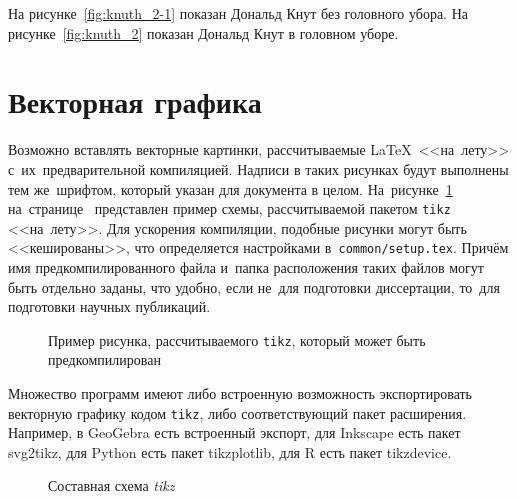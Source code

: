 На рисунке~\cref{fig:knuth_2-1} показан Дональд Кнут без головного убора.
На рисунке~\cref{fig:knuth_2}
показан Дональд Кнут в головном уборе.

\section{Векторная графика}\label{sec:ch2/vector}

Возможно вставлять векторные картинки, рассчитываемые \LaTeX\ <<на~лету>>
с~их~предварительной компиляцией. Надписи в таких рисунках будут выполнены
тем же~шрифтом, который указан для документа в целом.
На~рисунке~\cref{fig:tikz_example} на~странице~\pageref{fig:tikz_example}
представлен пример схемы, рассчитываемой пакетом \verb|tikz| <<на~лету>>.
Для ускорения компиляции, подобные рисунки могут быть <<кешированы>>, что
определяется настройками в~\verb|common/setup.tex|.
Причём имя предкомпилированного
файла и~папка расположения таких файлов могут быть отдельно заданы,
что удобно, если не~для подготовки диссертации,
то~для подготовки научных публикаций.
\begin{figure}[ht]
    \legend{}
    \caption[Пример \texttt{tikz} схемы]{Пример рисунка, рассчитываемого
        \texttt{tikz}, который может быть предкомпилирован}\label{fig:tikz_example}
\end{figure}

Множество программ имеют либо встроенную возможность экспортировать векторную
графику кодом \verb|tikz|, либо соответствующий пакет расширения.
Например, в GeoGebra есть встроенный экспорт,
для Inkscape есть пакет svg2tikz,
для Python есть пакет tikzplotlib,
для R есть пакет tikzdevice.

\begin{figure}[htbp]
    \caption{Составная схема \textit{tikz}}\label{fig:scheme-tikz}
\end{figure}

